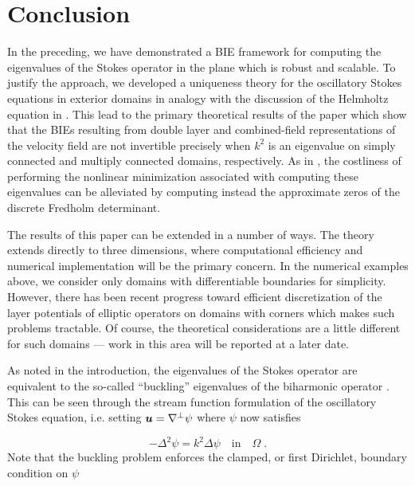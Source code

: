 \section{Conclusion}
\label{sec:conclusion}

In the preceding, we have demonstrated a
BIE framework for computing the eigenvalues
of the Stokes operator in the plane which
is robust and scalable.
%
To justify the
approach, we developed a uniqueness theory
for the oscillatory Stokes equations in
exterior domains in analogy with the
discussion of the Helmholtz equation in
\cite{colton1983integral}.
%
This lead to the primary theoretical
results of the paper which show that the
BIEs resulting from double layer and
combined-field representations of the
velocity field are 
not invertible precisely when $k^2$ is
an eigenvalue on simply connected
and multiply connected domains, respectively.
%
As in \cite{zhao2015robust}, the costliness
of performing the nonlinear minimization
associated with computing these eigenvalues
can be alleviated by computing instead the
approximate zeros of the discrete Fredholm
determinant.

The results of this paper can be
extended in a number of ways.
%
The theory
extends directly to three dimensions, where
computational efficiency and numerical
implementation will be the primary concern.
%
In the numerical examples above, we
consider only domains with differentiable
boundaries for simplicity.
%
However, there has been recent progress
toward efficient discretization of the
layer potentials of elliptic operators
on domains with corners
\cite{helsing2008corner,serkh2016solution,rachh2017solution,helsing2018integral}
which makes such problems tractable.
%
Of course, the theoretical considerations
are a little different for such domains
--- work in this area will be reported at
a later date.

As noted in the introduction, the
eigenvalues of the Stokes operator are
equivalent to the so-called
``buckling'' eigenvalues of the
biharmonic operator \cite{kelliher2009eigenvalues}.
%
This can be seen through the stream function
formulation  of the oscillatory Stokes
equation, i.e. setting ${\boldsymbol u} = \nabla^\perp \psi$
where $\psi$ now satisfies

\begin{equation*}
  -\Delta^2 \psi = k^2 \Delta \psi \quad \textrm{in} \quad \Omega\; .
\end{equation*}
Note that the buckling problem enforces the
clamped, or first Dirichlet, boundary
condition on $\psi$

